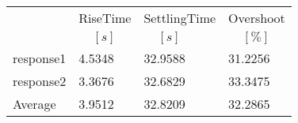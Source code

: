 \begin{tabular}{llll}
  & RiseTime & SettlingTime & Overshoot  \\ 
  & $\;\;\;\;[s]$ & $\;\;\;\;[s]$ & $\;\;\;\;[\%]$  \\ 
\hline 
response1 & 4.5348 & 32.9588 & 31.2256  \\ 
response2 & 3.3676 & 32.6829 & 33.3475 \\ 
Average & 3.9512 & 32.8209 & 32.2865  \\ 
\hline 
\end{tabular}